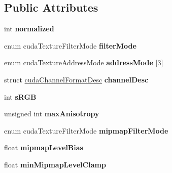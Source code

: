 \subsection*{Public Attributes}
\begin{DoxyCompactItemize}
\item 
int {\bfseries normalized}\hypertarget{structtextureReference_a7d2636ed684123f1eb107a7b96f5aee7}{}\label{structtextureReference_a7d2636ed684123f1eb107a7b96f5aee7}

\item 
enum cuda\+Texture\+Filter\+Mode {\bfseries filter\+Mode}\hypertarget{structtextureReference_a3c864a737142c3c62350c03cea63aa1c}{}\label{structtextureReference_a3c864a737142c3c62350c03cea63aa1c}

\item 
enum cuda\+Texture\+Address\+Mode {\bfseries address\+Mode} \mbox{[}3\mbox{]}\hypertarget{structtextureReference_ade42b21b7e4fa51ceb22a63361bc9234}{}\label{structtextureReference_ade42b21b7e4fa51ceb22a63361bc9234}

\item 
struct \hyperlink{structcudaChannelFormatDesc}{cuda\+Channel\+Format\+Desc} {\bfseries channel\+Desc}\hypertarget{structtextureReference_af5088889b774c5854b2858c3906bebd5}{}\label{structtextureReference_af5088889b774c5854b2858c3906bebd5}

\item 
int {\bfseries s\+R\+GB}\hypertarget{structtextureReference_a09d0a817542f9dc476ed9a85f87e8394}{}\label{structtextureReference_a09d0a817542f9dc476ed9a85f87e8394}

\item 
unsigned int {\bfseries max\+Anisotropy}\hypertarget{structtextureReference_a82d0f26cd796675da5ac4c760d6948b2}{}\label{structtextureReference_a82d0f26cd796675da5ac4c760d6948b2}

\item 
enum cuda\+Texture\+Filter\+Mode {\bfseries mipmap\+Filter\+Mode}\hypertarget{structtextureReference_ae2c0daace5873d2eea39f0a61976460e}{}\label{structtextureReference_ae2c0daace5873d2eea39f0a61976460e}

\item 
float {\bfseries mipmap\+Level\+Bias}\hypertarget{structtextureReference_ab44c375e9b8d99b26aba0700046f8f6c}{}\label{structtextureReference_ab44c375e9b8d99b26aba0700046f8f6c}

\item 
float {\bfseries min\+Mipmap\+Level\+Clamp}\hypertarget{structtextureReference_a41f408f3e94cd418b16a1066fbcb0665}{}\label{structtextureReference_a41f408f3e94cd418b16a1066fbcb0665}


\end{DoxyCompactItemize}
